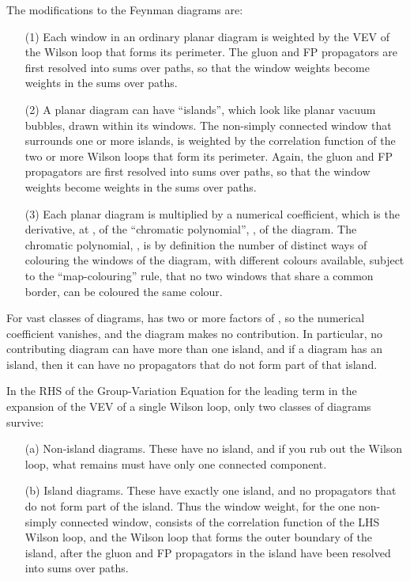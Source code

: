 \documentclass[a4paper,12pt,oneside]{article}
\begin{document}
The modifications to the Feynman diagrams are:
\begin{itemize}
\item[(1)] Each window in an ordinary planar diagram is weighted by the VEV of the
Wilson loop that forms its perimeter.  The gluon and FP propagators are
first resolved into sums over paths, so that the window weights become
weights in the sums over paths.
\item[(2)] A planar diagram can have ``islands'', which look like planar vacuum
bubbles, drawn within its windows.  The non-simply connected window that
surrounds one or more islands, is weighted by the correlation function of
the two or more Wilson loops that form its perimeter.  Again, the gluon and
FP propagators are first resolved into sums over paths, so that the window
weights become weights in the sums over paths.
\item[(3)] Each planar diagram is multiplied by a numerical coefficient, which is
the derivative, at \coordHE{}, of the ``chromatic polynomial'', \coordHE{}, of
the diagram.  The chromatic polynomial, \coordHE{}, is by definition
the number of distinct ways of colouring the windows of the diagram, with
\coordHE{} different colours available, subject to the ``map-colouring'' rule, that
no two windows that share a common border, can be coloured the same colour.
\end{itemize}

For vast classes of diagrams, \coordHE{} has two or more factors of
\coordHE{}, so the numerical coefficient vanishes, and the diagram makes no
contribution.  In particular, no contributing diagram can have more than one
island, and if a diagram has an island, then it can have no propagators that
do not form part of that island.

In the RHS of the Group-Variation Equation
for the leading term in the \coordHE{} expansion of the VEV of a single Wilson
loop, only two classes of diagrams survive:
\begin{itemize}
	\item[(a)] Non-island diagrams.  These have no island, and if you rub out the
Wilson loop, what remains must have only one connected component.
\item[(b)] Island diagrams.  These have exactly one island, and no propagators that
do not form part of the island.  Thus the window weight, for the one
non-simply connected window, consists of the correlation function of the LHS
Wilson loop, and the Wilson loop that forms the outer boundary of the
island, after the gluon and FP propagators in the island have been resolved
into sums over paths.
\end{itemize}
\end{document}
